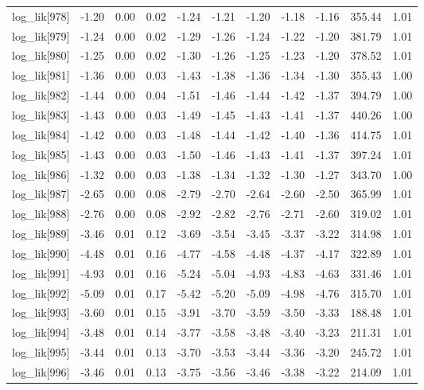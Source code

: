 \begin{table}[ht]
\begin{tabular}{rrrrrrrrrrr}
  log\_lik[978] & -1.20 & 0.00 & 0.02 & -1.24 & -1.21 & -1.20 & -1.18 & -1.16 & 355.44 & 1.01 \\ 
  log\_lik[979] & -1.24 & 0.00 & 0.02 & -1.29 & -1.26 & -1.24 & -1.22 & -1.20 & 381.79 & 1.01 \\ 
  log\_lik[980] & -1.25 & 0.00 & 0.02 & -1.30 & -1.26 & -1.25 & -1.23 & -1.20 & 378.52 & 1.01 \\ 
  log\_lik[981] & -1.36 & 0.00 & 0.03 & -1.43 & -1.38 & -1.36 & -1.34 & -1.30 & 355.43 & 1.00 \\ 
  log\_lik[982] & -1.44 & 0.00 & 0.04 & -1.51 & -1.46 & -1.44 & -1.42 & -1.37 & 394.79 & 1.00 \\ 
  log\_lik[983] & -1.43 & 0.00 & 0.03 & -1.49 & -1.45 & -1.43 & -1.41 & -1.37 & 440.26 & 1.00 \\ 
  log\_lik[984] & -1.42 & 0.00 & 0.03 & -1.48 & -1.44 & -1.42 & -1.40 & -1.36 & 414.75 & 1.01 \\ 
  log\_lik[985] & -1.43 & 0.00 & 0.03 & -1.50 & -1.46 & -1.43 & -1.41 & -1.37 & 397.24 & 1.01 \\ 
  log\_lik[986] & -1.32 & 0.00 & 0.03 & -1.38 & -1.34 & -1.32 & -1.30 & -1.27 & 343.70 & 1.00 \\ 
  log\_lik[987] & -2.65 & 0.00 & 0.08 & -2.79 & -2.70 & -2.64 & -2.60 & -2.50 & 365.99 & 1.01 \\ 
  log\_lik[988] & -2.76 & 0.00 & 0.08 & -2.92 & -2.82 & -2.76 & -2.71 & -2.60 & 319.02 & 1.01 \\ 
  log\_lik[989] & -3.46 & 0.01 & 0.12 & -3.69 & -3.54 & -3.45 & -3.37 & -3.22 & 314.98 & 1.01 \\ 
  log\_lik[990] & -4.48 & 0.01 & 0.16 & -4.77 & -4.58 & -4.48 & -4.37 & -4.17 & 322.89 & 1.01 \\ 
  log\_lik[991] & -4.93 & 0.01 & 0.16 & -5.24 & -5.04 & -4.93 & -4.83 & -4.63 & 331.46 & 1.01 \\ 
  log\_lik[992] & -5.09 & 0.01 & 0.17 & -5.42 & -5.20 & -5.09 & -4.98 & -4.76 & 315.70 & 1.01 \\ 
  log\_lik[993] & -3.60 & 0.01 & 0.15 & -3.91 & -3.70 & -3.59 & -3.50 & -3.33 & 188.48 & 1.01 \\ 
  log\_lik[994] & -3.48 & 0.01 & 0.14 & -3.77 & -3.58 & -3.48 & -3.40 & -3.23 & 211.31 & 1.01 \\ 
  log\_lik[995] & -3.44 & 0.01 & 0.13 & -3.70 & -3.53 & -3.44 & -3.36 & -3.20 & 245.72 & 1.01 \\ 
  log\_lik[996] & -3.46 & 0.01 & 0.13 & -3.75 & -3.56 & -3.46 & -3.38 & -3.22 & 214.09 & 1.01 \\ 

\end{tabular}
\end{table}
